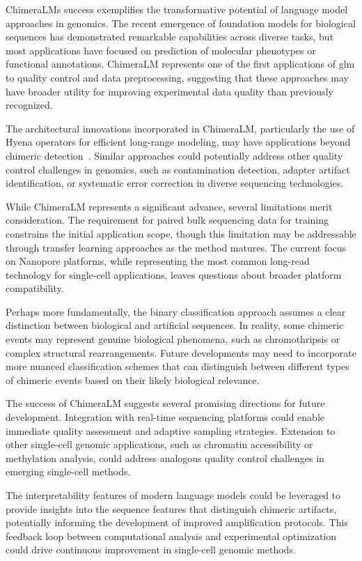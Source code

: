 \documentclass[pdflatex,sn-nature]{sn-jnl}%
\theoremstyle{thmstyleone}%
\theoremstyle{thmstyletwo}%
\theoremstyle{thmstylethree}%
\begin{document}
ChimeraLM\textquotesingle s success exemplifies the transformative potential of language model approaches in genomics.
The recent emergence of foundation models for biological sequences has demonstrated remarkable capabilities across diverse tasks, but most applications have focused on prediction of molecular phenotypes or functional annotations.
ChimeraLM represents one of the first applications of \gls{glm} to quality control and data preprocessing, suggesting that these approaches may have broader utility for improving experimental data quality than previously recognized.

The architectural innovations incorporated in ChimeraLM, particularly the use of Hyena operators for efficient long-range modeling, may have applications beyond chimeric detection~\cite{Poli2023HyenaHT, nguyen2023hyenadna}.
Similar approaches could potentially address other quality control challenges in genomics, such as contamination detection, adapter artifact identification, or systematic error correction in diverse sequencing technologies.

While ChimeraLM represents a significant advance, several limitations merit consideration.
The requirement for paired bulk sequencing data for training constrains the initial application scope, though this limitation may be addressable through transfer learning approaches as the method matures.
The current focus on Nanopore platforms, while representing the most common long-read technology for single-cell applications, leaves questions about broader platform compatibility.

Perhaps more fundamentally, the binary classification approach assumes a clear distinction between biological and artificial sequences.
In reality, some chimeric events may represent genuine biological phenomena, such as chromothripsis or complex structural rearrangements.
Future developments may need to incorporate more nuanced classification schemes that can distinguish between different types of chimeric events based on their likely biological relevance.

The success of ChimeraLM suggests several promising directions for future development.
Integration with real-time sequencing platforms could enable immediate quality assessment and adaptive sampling strategies.
Extension to other single-cell genomic applications, such as chromatin accessibility or methylation analysis, could address analogous quality control challenges in emerging single-cell methods.

The interpretability features of modern language models could be leveraged to provide insights into the sequence features that distinguish chimeric artifacts, potentially informing the development of improved amplification protocols.
This feedback loop between computational analysis and experimental optimization could drive continuous improvement in single-cell genomic methods.
\end{document}
